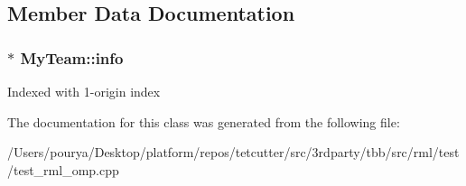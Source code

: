 \subsection{Member Data Documentation}
\hypertarget{classMyTeam_afb85d6f47b539b64d9b7088ea5921ec5}{}
\subsubsection[{info}]{$\ast$ My\+Team\+::info}\label{classMyTeam_afb85d6f47b539b64d9b7088ea5921ec5}
Indexed with 1-\/origin index 

The documentation for this class was generated from the following file\+:\begin{DoxyCompactItemize}
\item 
/\+Users/pourya/\+Desktop/platform/repos/tetcutter/src/3rdparty/tbb/src/rml/test/test\+\_\+rml\+\_\+omp.\+cpp\end{DoxyCompactItemize}
